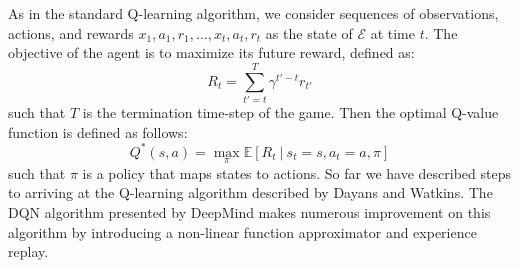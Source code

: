 \documentclass{article}
\begin{document}
As in the standard Q-learning algorithm, we consider sequences of observations, actions, and rewards $x_1, a_1, r_1, \dots, x_t, a_t, r_t$ as the state of $\mathcal{E}$ at time $t$. 
The objective of the agent is to maximize its future reward, defined as:
\begin{equation}
\displaystyle R_t = \sum_{t' = t}^{T} \gamma^{t' - t}r_{t'}
\end{equation}
such that $T$ is the termination time-step of the game.
Then the optimal Q-value function is defined as follows:
\begin{equation}
\displaystyle Q^{*}(s, a) = \max_{\pi}\mathbb{E}[R_t\ |\ s_t = s, a_t = a, \pi]
\end{equation}
such that $\pi$ is a policy that maps states to actions.
So far we have described steps to arriving at the Q-learning algorithm described by Dayans and Watkins. \cite{qlearning} 
The DQN algorithm presented by DeepMind makes numerous improvement on this algorithm by introducing a non-linear function approximator and experience replay.
\end{document}

